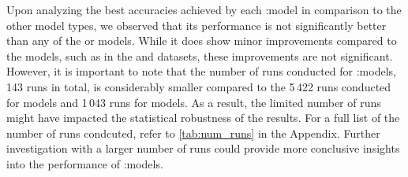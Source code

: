 \begin{table}[!htb]
	\caption{Overview of the classification accuracies achieved by the best model configuration for each dataset in percent and standard deviation. Additionally, the performance of each configuration was furhter evaluated by substituting the final \mlp with either a \textsf{SVM} utilizing a linear kernel (\textsf{SVM Linear}) or the Radial Basis Function (\textsf{SVM RBF}), as well as the \textsf{$k$-NN} classifier with different values for $k$.}
	\label{tab:wlnn_gnn}
\end{table}
Upon analyzing the best accuracies achieved by each \wl:\gnn model in comparison to the other model types, we observed that its performance is not significantly better than any of the \gnn or \wlnn models. While it does show minor improvements compared to the \gnn models, such as in the \enzymes and \proteins datasets, these improvements are not significant. However, it is important to note that the number of runs conducted for \wl:\gnn models, 143 runs in total, is considerably smaller compared to the 5\,422 runs conducted for \wlnn models and 1\,043 runs for \gnn models. As a result, the limited number of runs might have impacted the statistical robustness of the results. For a full list of the number of runs condcuted, refer to \cref{tab:num_runs} in the Appendix. Further investigation with a larger number of runs could provide more conclusive insights into the performance of \wl:\gnn models.

